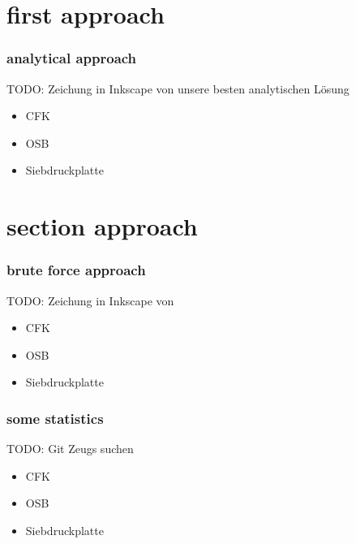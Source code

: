 \documentclass{beamer}
\begin{document}
\section{first approach} 

\begin{frame}
\frametitle{analytical approach}
TODO: Zeichung in Inkscape von unsere besten analytischen Lösung
\begin{itemize}
    \item CFK
    \item OSB
    \item Siebdruckplatte
\end{itemize}
\end{frame}


\section{section approach} 
\begin{frame}
\frametitle{brute force approach}
TODO: Zeichung in Inkscape von
\begin{itemize}
    \item CFK
    \item OSB
    \item Siebdruckplatte
\end{itemize}
\end{frame}
\begin{frame}
\frametitle{some statistics}
TODO: Git Zeugs suchen 

\begin{itemize}
    \item CFK
    \item OSB
    \item Siebdruckplatte
\end{itemize}
\end{frame}

\end{document}
